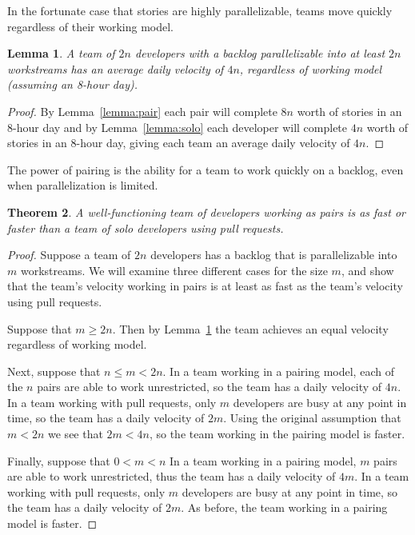 \documentclass[letterpaper]{article}
\newtheorem{theorem}{Theorem}[section]
\newtheorem{lemma}[theorem]{Lemma}
\theoremstyle{definition}
\begin{document}
    In the fortunate case that stories are highly parallelizable, teams move quickly regardless of their working model.

    \begin{lemma}
        \label{lemma:parallel}
        A team of $2n$ developers with a backlog parallelizable into at least $2n$ workstreams has an average daily velocity of $4n$,
        regardless of working model (assuming an 8-hour day).
    \end{lemma}
    \begin{proof}
        By Lemma~\ref{lemma:pair} each pair will complete $8n$ worth of stories in an 8-hour day and by
        Lemma~\ref{lemma:solo} each developer will complete $4n$ worth of stories in an 8-hour day, giving each team an
        average daily velocity of $4n$.
    \end{proof}

    The power of pairing is the ability for a team to work quickly on a backlog, even when parallelization is limited.

    \begin{theorem}
        A well-functioning team of developers working as pairs is as fast or faster than a team of solo developers using
        pull requests.
    \end{theorem}
    \begin{proof}
        Suppose a team of $2n$ developers has a backlog that is parallelizable into $m$ workstreams.
        We will examine three different cases for the size $m$, and show that the team's velocity working in pairs is at
        least as fast as the team's velocity using pull requests.

        Suppose that $m\geq 2n$.
        Then by Lemma~\ref{lemma:parallel} the team achieves an equal velocity regardless of working model.

        Next, suppose that $n\leq m < 2n$.
        In a team working in a pairing model, each of the $n$ pairs are able to work unrestricted, so the team has a
        daily velocity of $4n$.
        In a team working with pull requests, only $m$ developers are busy at any point in time, so the team has a daily
        velocity of $2m$.
        Using the original assumption that $m < 2n$ we see that $2m < 4n$, so the team working in the pairing model is
        faster.

        Finally, suppose that $0 < m < n$
        In a team working in a pairing model, $m$ pairs are able to work unrestricted, thus the team has a daily
        velocity of $4m$.
        In a team working with pull requests, only $m$ developers are busy at any point in time, so the team has a daily
        velocity of $2m$.
        As before, the team working in a pairing model is faster.
    \end{proof}
\end{document}
